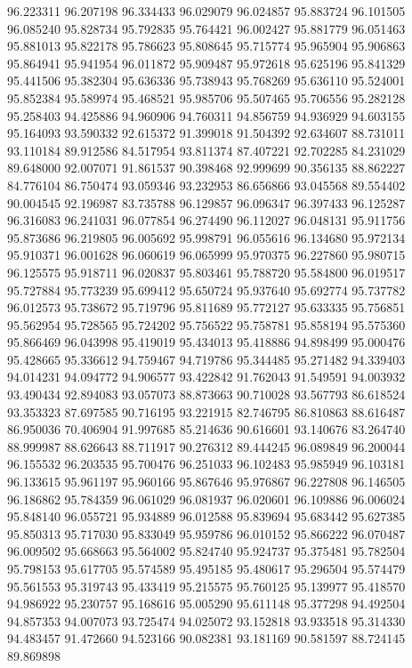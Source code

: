 96.223311
96.207198
96.334433
96.029079
96.024857
95.883724
96.101505
96.085240
95.828734
95.792835
95.764421
96.002427
95.881779
96.051463
95.881013
95.822178
95.786623
95.808645
95.715774
95.965904
95.906863
95.864941
95.941954
96.011872
95.909487
95.972618
95.625196
95.841329
95.441506
95.382304
95.636336
95.738943
95.768269
95.636110
95.524001
95.852384
95.589974
95.468521
95.985706
95.507465
95.706556
95.282128
95.258403
94.425886
94.960906
94.760311
94.856759
94.936929
94.603155
95.164093
93.590332
92.615372
91.399018
91.504392
92.634607
88.731011
93.110184
89.912586
84.517954
93.811374
87.407221
92.702285
84.231029
89.648000
92.007071
91.861537
90.398468
92.999699
90.356135
88.862227
84.776104
86.750474
93.059346
93.232953
86.656866
93.045568
89.554402
90.004545
92.196987
83.735788
96.129857
96.096347
96.397433
96.125287
96.316083
96.241031
96.077854
96.274490
96.112027
96.048131
95.911756
95.873686
96.219805
96.005692
95.998791
96.055616
96.134680
95.972134
95.910371
96.001628
96.060619
96.065999
95.970375
96.227860
95.980715
96.125575
95.918711
96.020837
95.803461
95.788720
95.584800
96.019517
95.727884
95.773239
95.699412
95.650724
95.937640
95.692774
95.737782
96.012573
95.738672
95.719796
95.811689
95.772127
95.633335
95.756851
95.562954
95.728565
95.724202
95.756522
95.758781
95.858194
95.575360
95.866469
96.043998
95.419019
95.434013
95.418886
94.898499
95.000476
95.428665
95.336612
94.759467
94.719786
95.344485
95.271482
94.339403
94.014231
94.094772
94.906577
93.422842
91.762043
91.549591
94.003932
93.490434
92.894083
93.057073
88.873663
90.710028
93.567793
86.618524
93.353323
87.697585
90.716195
93.221915
82.746795
86.810863
88.616487
86.950036
70.406904
91.997685
85.214636
90.616601
93.140676
83.264740
88.999987
88.626643
88.711917
90.276312
89.444245
96.089849
96.200044
96.155532
96.203535
95.700476
96.251033
96.102483
95.985949
96.103181
96.133615
95.961197
95.960166
95.867646
95.976867
96.227808
96.146505
96.186862
95.784359
96.061029
96.081937
96.020601
96.109886
96.006024
95.848140
96.055721
95.934889
96.012588
95.839694
95.683442
95.627385
95.850313
95.717030
95.833049
95.959786
96.010152
95.866222
96.070487
96.009502
95.668663
95.564002
95.824740
95.924737
95.375481
95.782504
95.798153
95.617705
95.574589
95.495185
95.480617
95.296504
95.574479
95.561553
95.319743
95.433419
95.215575
95.760125
95.139977
95.418570
94.986922
95.230757
95.168616
95.005290
95.611148
95.377298
94.492504
94.857353
94.007073
93.725474
94.025072
93.152818
93.933518
95.314330
94.483457
91.472660
94.523166
90.082381
93.181169
90.581597
88.724145
89.869898
